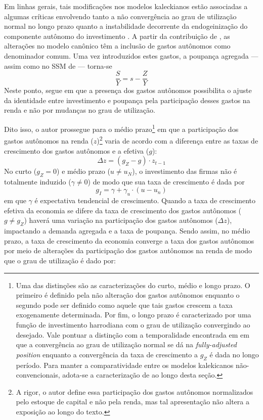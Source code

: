 Em linhas gerais, tais modificações nos modelos kaleckianos estão associadas a algumas críticas envolvendo tanto a não convergência ao grau de utilização normal no longo prazo quanto a instabilidade decorrente da endogeinização do componente autônomo do investimento \cites{dallery_kaleckian_2007}{skott_theoretical_2012}{hein_harrodian_2012}.
A partir da contribuição de \textcite{allain_tackling_2015}, as alterações no modelo canônico têm a inclusão de gastos autônomos como denominador comum.
Uma vez introduzidos estes gastos, a poupança agregada --- assim como no SSM de \textcite{serrano_sraffian_1995} --- torna-se
$$
\frac{S}{Y} = s - \frac{Z}{Y}
$$
Neste ponto, \textcite[p.~10]{allain_tackling_2015} segue \textcite{serrano_sraffian_1995} em que a presença dos gastos autônomos possibilita o ajuste da identidade entre investimento e poupança pela participação desses gastos na renda e não por mudanças no grau de utilização. 

Dito isso, o autor prossegue para o médio prazo\footnote{
	Uma das distinções \textcite{allain_tackling_2015} são as caracterizações do curto, médio e longo prazo. O primeiro é definido pela não alteração dos gastos autônomos enquanto o segundo pode ser definido como aquele que tais gastos crescem a taxa exogenamente determinada. Por fim, o longo prazo é caracterizado por uma função de investimento harrodiana com o grau de utilização convergindo ao desejado. Vale pontuar a distinção com a temporalidade encontrada em \textcite{freitas_growth_2015} em que a convergência ao grau de utilização normal se dá na \textit{fully-adjusted position} enquanto a convergência da taxa de crescimento a $g_Z$ é dada no longo período. Para manter a comparatividade entre os modelos kalekicanos não-convencionais, adota-se a caracterização de \textcite{allain_tackling_2015} ao longo desta seção.
} em que a participação dos gastos autônomos na renda ($z$)\footnote{A rigor, o autor define essa participação dos gastos autônomos normalizados pelo estoque de capital e não pela renda, mas tal apresentação não altera a exposição ao longo do texto.} varia de acordo com a diferença entre as taxas de crescimento dos gastos autônomos e a efetiva ($g$):
\begin{equation}
\Delta z = (g_Z - g)\cdot z_{t-1}
\end{equation}
No curto ($g_Z = 0$) e médio prazo ($u \neq u_N$), o investimento das firmas não é totalmente induzido ($\gamma \neq 0$) de modo que sua taxa de crescimento é dada por
$$
g_I = \gamma + \gamma_u\cdot (u - u_n)
$$
em que $\gamma$ é expectativa tendencial de crescimento.
Quando a taxa de crescimento efetiva da economia se difere da taxa de crescimento dos gastos autônomos ($g\neq g_Z$)  haverá uma variação na participação dos gastos autônomos ($\Delta z$), impactando a demanda agregada e a taxa de poupança. 
Sendo assim, no médio prazo, a taxa de crescimento da economia converge a taxa dos gastos autônomos por meio de alterações da participação dos gastos autônomos na renda de modo que o grau de utilização é dado por:

